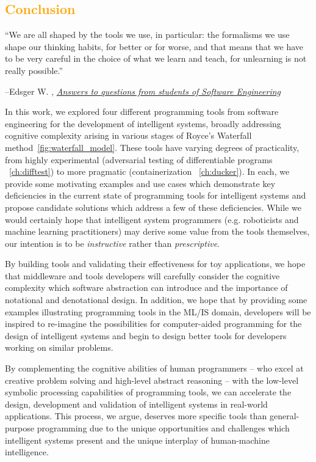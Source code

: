 \documentclass[12pt,initial,twoside,maitrise]{dms}
\newcommand{\mediumrare}[1]{\textcolor{orange}{#1}}
\numberwithin{equation}{section}
\numberwithin{table}{chapter}
\numberwithin{figure}{chapter}
\begin{document}
\mediumrare{\chapter{Conclusion}\label{ch:conclusion}}
\setlength{\epigraphwidth}{0.90\textwidth}
\epigraph{``We are all shaped by the tools we use, in particular: the formalisms we use shape our thinking habits, for better or for worse, and that means that we have to be very careful in the choice of what we learn and teach, for unlearning is not really possible.''}{\begin{flushright}--Edsger W. \citet{dijkstra2000answers}, \href{https://www.cs.utexas.edu/~EWD/transcriptions/EWD13xx/EWD1305.html}{\textit{Answers to questions from students of Software Engineering}}\end{flushright}}

In this work, we explored four different programming tools from software engineering for the development of intelligent systems, broadly addressing cognitive complexity arising in various stages of Royce's Waterfall method~\autoref{fig:waterfall_model}. These tools have varying degrees of practicality, from highly experimental (adversarial testing of differentiable programs ~\autoref{ch:difftest}) to more pragmatic (containerization ~\autoref{ch:ducker}). In each, we provide some motivating examples and use cases which demonstrate key deficiencies in the current state of programming tools for intelligent systems and propose candidate solutions which address a few of these deficiencies. While we would certainly hope that intelligent system programmers (e.g. roboticists and machine learning practitioners) may derive some value from the tools themselves, our intention is to be \textit{instructive} rather than \textit{prescriptive}.

By building tools and validating their effectiveness for toy applications, we hope that middleware and tools developers will carefully consider the cognitive complexity which software abstraction can introduce and the importance of notational and denotational design. In addition, we hope that by providing some examples illustrating programming tools in the ML/IS domain, developers will be inspired to re-imagine the possibilities for computer-aided programming for the design of intelligent systems and begin to design better tools for developers working on similar problems.

By complementing the cognitive abilities of human programmers -- who excel at creative problem solving and high-level abstract reasoning -- with the low-level symbolic processing capabilities of programming tools, we can accelerate the design, development and validation of intelligent systems in real-world applications. This process, we argue, deserves more specific tools than general-purpose programming due to the unique opportunities and challenges which intelligent systems present and the unique interplay of human-machine intelligence.
\end{document}
